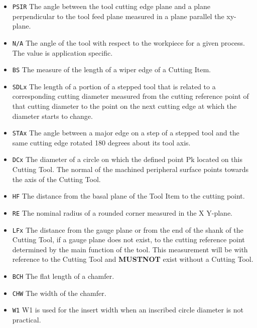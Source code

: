 \begin{itemize}
\begin{itemize}
\item \texttt{PSIR} \newline The angle between the tool cutting edge plane and a plane perpendicular to the tool feed plane measured in a plane parallel the xy-plane. 
\item \texttt{N/A} \newline The angle of the tool with respect to the workpiece for a given process. The value is application specific. 
\item \texttt{BS} \newline The measure of the length of a wiper edge of a Cutting Item. 
\item \texttt{SDLx} \newline The length of a portion of a stepped tool that is related to a corresponding cutting diameter measured from the cutting reference point of that cutting diameter to the point on the next cutting edge at which the diameter starts to change. 
\item \texttt{STAx} \newline The angle between a major edge on a step of a stepped tool and the same cutting edge rotated 180 degrees about its tool axis. 
\item \texttt{DCx} \newline The diameter of a circle on which the defined point Pk located on this Cutting Tool. The normal of the machined peripheral surface points towards the axis of the Cutting Tool. 
\item \texttt{HF} \newline The distance from the basal plane of the Tool Item to the cutting point. 
\item \texttt{RE} \newline The nominal radius of a rounded corner measured in the X Y-plane. 
\item \texttt{LFx} \newline The distance from the gauge plane or from the end of the shank of the Cutting Tool, if a gauge plane does not exist, to the cutting reference point determined by the main function of the tool. This measurement will be with reference to the Cutting Tool and \textbf{MUSTNOT} exist without a Cutting Tool. 
\item \texttt{BCH} \newline The flat length of a chamfer. 
\item \texttt{CHW} \newline The width of the chamfer. 
\item \texttt{W1} \newline W1 is used for the insert width when an inscribed circle diameter is not practical. 
\end{itemize}



\end{itemize}
